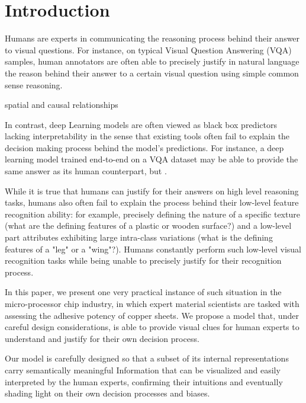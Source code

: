 \documentclass[10pt,twocolumn,letterpaper]{article}
\begin{document}
\section{Introduction}

Humans are experts in communicating the reasoning process behind their answer to visual questions.
For instance, on typical Visual Question Answering (VQA) samples, 
human annotators are often able to precisely justify in natural language the reason 
behind their answer to a certain visual question using simple common sense reasoning.

spatial and causal relationships

In contrast, deep Learning models are often viewed as black box predictors lacking interpretability 
in the sense that existing tools often fail to explain the decision making process behind the model’s predictions.
For instance, a deep learning model trained end-to-end on a VQA dataset may be able to provide the same answer as its
human counterpart, but .

While it is true that humans can justify for their answers on high level reasoning tasks, 
humans also often fail to explain the process behind their low-level feature recognition ability:
for example, precisely defining the nature of a specific texture (what are the defining features of a plastic or wooden surface?) and a low-level part attributes exhibiting large intra-class variations (what is the defining features of a "leg" or a "wing"?).
Humans constantly perform such low-level visual recognition tasks while being unable to precisely justify for their recognition process.

In this paper, we present one very practical instance of such situation in the micro-processor chip industry, 
in which expert material scientists are tasked with assessing the adhesive potency of copper sheets.
We propose a model that, under careful design considerations, is able to provide visual clues 
for human experts to understand and justify for their own decision process.

Our model is carefully designed so that a subset of its internal representations carry semantically meaningful 
Information that can be visualized and easily interpreted by the human experts, confirming their intuitions 
and eventually shading light on their own decision processes and biases.
\end{document}
